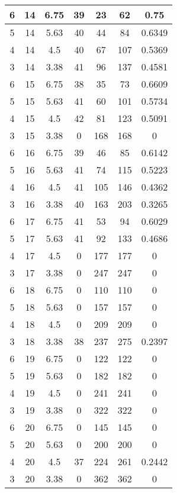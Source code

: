 \documentclass[letterpaper, 12pt]{article}
\begin{document}
\begin{longtable}{|c|c|c|c|c|c|c|}
6 & 14 & 6.75 & 39 & 23 & 62 & 0.75 \\
\hline
5 & 14 & 5.63 & 40 & 44 & 84 & 0.6349 \\
\hline
4 & 14 & 4.5 & 40 & 67 & 107 & 0.5369 \\
\hline
3 & 14 & 3.38 & 41 & 96 & 137 & 0.4581 \\
\hline
6 & 15 & 6.75 & 38 & 35 & 73 & 0.6609 \\
\hline
5 & 15 & 5.63 & 41 & 60 & 101 & 0.5734 \\
\hline
4 & 15 & 4.5 & 42 & 81 & 123 & 0.5091 \\
\hline
3 & 15 & 3.38 & 0 & 168 & 168 & 0 \\
\hline
6 & 16 & 6.75 & 39 & 46 & 85 & 0.6142 \\
\hline
5 & 16 & 5.63 & 41 & 74 & 115 & 0.5223 \\
\hline
4 & 16 & 4.5 & 41 & 105 & 146 & 0.4362 \\
\hline
3 & 16 & 3.38 & 40 & 163 & 203 & 0.3265 \\
\hline
6 & 17 & 6.75 & 41 & 53 & 94 & 0.6029 \\
\hline
5 & 17 & 5.63 & 41 & 92 & 133 & 0.4686 \\
\hline
4 & 17 & 4.5 & 0 & 177 & 177 & 0 \\
\hline
3 & 17 & 3.38 & 0 & 247 & 247 & 0 \\
\hline
6 & 18 & 6.75 & 0 & 110 & 110 & 0 \\
\hline
5 & 18 & 5.63 & 0 & 157 & 157 & 0 \\
\hline
4 & 18 & 4.5 & 0 & 209 & 209 & 0 \\
\hline
3 & 18 & 3.38 & 38 & 237 & 275 & 0.2397 \\
\hline
6 & 19 & 6.75 & 0 & 122 & 122 & 0 \\
\hline
5 & 19 & 5.63 & 0 & 182 & 182 & 0 \\
\hline
4 & 19 & 4.5 & 0 & 241 & 241 & 0 \\
\hline
3 & 19 & 3.38 & 0 & 322 & 322 & 0 \\
\hline
6 & 20 & 6.75 & 0 & 145 & 145 & 0 \\
\hline
5 & 20 & 5.63 & 0 & 200 & 200 & 0 \\
\hline
4 & 20 & 4.5 & 37 & 224 & 261 & 0.2442 \\
\hline
3 & 20 & 3.38 & 0 & 362 & 362 & 0 \\
\hline
\end{longtable}
\end{document}
